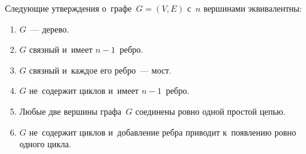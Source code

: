 \begin{theorem}
Следующие утверждения о~графе~$G = (V, E)$ с~$n$ вершинами эквивалентны:
\begin{enumerate}
	\item\label{st:about_tree_1} $G$~--- дерево.
	\item\label{st:about_tree_2} $G$ связный и~имеет $n - 1$~ребро.
	\item\label{st:about_tree_3} $G$ связный и~каждое его ребро~--- мост.
	\item\label{st:about_tree_4} $G$ не~содержит циклов и~имеет $n - 1$~ребро.
	\item\label{st:about_tree_5} Любые две вершины графа~$G$ соединены ровно одной простой цепью.
	\item\label{st:about_tree_6} $G$ не~содержит циклов и~добавление ребра приводит к~появлению ровно одного цикла.
\end{enumerate}
\end{theorem}
